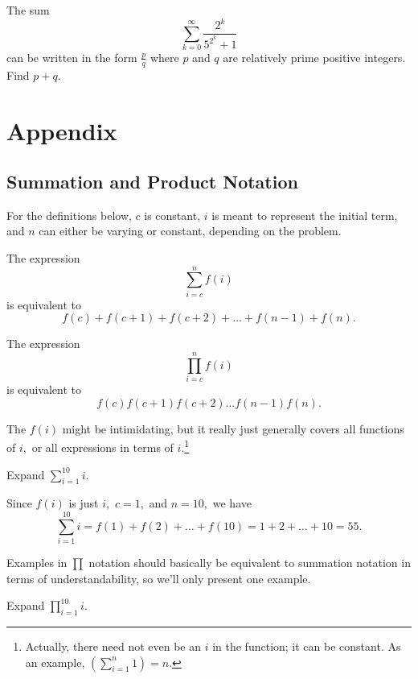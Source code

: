 \documentclass[mast]{lucky}
\begin{document}
\begin{prob}{13}
The sum
\[\sum_{k=0}^{\infty} \frac{2^{k}}{5^{2^{k}}+1}\]can be written in the form $\frac{p}{q}$ where $p$ and $q$ are relatively prime positive integers. Find $p+q$.
\end{prob}

\pagebreak

\section{Appendix}

\subsection{Summation and Product Notation}

For the definitions below, $c$ is constant, $i$ is meant to represent the initial term, and $n$ can either be varying or constant, depending on the problem.

\begin{defi}
The expression $$\sum\limits_{i=c}^n f(i)$$ is equivalent to $$f(c)+f(c+1)+f(c+2)+\dots+f(n-1)+f(n).$$
\end{defi}

\begin{defi}
The expression $$\prod\limits_{i=c}^n f(i)$$ is equivalent to $$f(c)f(c+1)f(c+2)\dots f(n-1)f(n).$$
\end{defi}

The $f(i)$ might be intimidating, but it really just generally covers all functions of $i,$ or all expressions in terms of $i.$\footnote{Actually, there need not even be an $i$ in the function; it can be constant. As an example, $\left(\sum\limits_{i=1}^n 1\right)=n.$}

\begin{exam}
Expand $\sum\limits_{i=1}^{10} i.$
\end{exam}

\begin{sol}
Since $f(i)$ is just $i,$ $c=1,$ and $n=10,$ we have $$\sum\limits_{i=1}^{10}i=f(1)+f(2)+\dots+f(10)=1+2+\dots+10=55.$$
\end{sol}

Examples in $\prod\limits$ notation should basically be equivalent to summation notation in terms of understandability, so we'll only present one example.

\begin{exam}
Expand $\prod\limits_{i=1}^{10} i.$
\end{exam}
\end{document}
